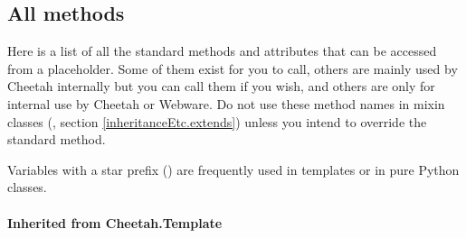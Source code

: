 
\subsection{All methods}
\label{tips.allMethods}

Here is a list of all the standard methods and attributes that can be accessed
from a placeholder.  Some of them exist for you to call, others are mainly used
by Cheetah internally but you can call them if you wish, and others are only
for internal use by Cheetah or Webware.  Do not use these method names in mixin
classes (, section \ref{inheritanceEtc.extends}) unless you
intend to override the standard method.  

Variables with a star prefix ({\bf *}) are frequently used in templates or in
pure Python classes.

\paragraph*{Inherited from Cheetah.Template}

